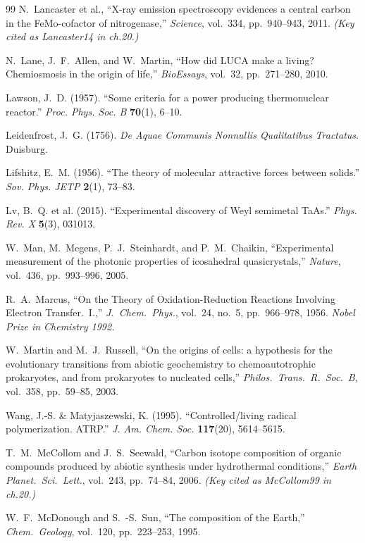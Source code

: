 \documentclass[12pt,oneside]{book}
\begin{document}
\begin{thebibliography}{99}
N.~Lancaster et al.,
``X-ray emission spectroscopy evidences a central carbon in the FeMo-cofactor of nitrogenase,''
\emph{Science}, vol.~334, pp.~940--943, 2011.
\textit{(Key cited as Lancaster14 in ch.20.)}

N.~Lane, J.~F.~Allen, and W.~Martin,
``How did LUCA make a living? Chemiosmosis in the origin of life,''
\emph{BioEssays}, vol.~32, pp.~271--280, 2010.

Lawson, J.~D. (1957).
``Some criteria for a power producing thermonuclear reactor.''
\textit{Proc. Phys. Soc. B} \textbf{70}(1), 6--10.

Leidenfrost, J.~G. (1756).
\textit{De Aquae Communis Nonnullis Qualitatibus Tractatus}. Duisburg.

Lifshitz, E.~M. (1956).
``The theory of molecular attractive forces between solids.''
\textit{Sov. Phys. JETP} \textbf{2}(1), 73--83.

Lv, B.~Q. et al. (2015).
``Experimental discovery of Weyl semimetal TaAs.''
\textit{Phys. Rev. X} \textbf{5}(3), 031013.

W.~Man, M.~Megens, P.~J.~Steinhardt, and P.~M.~Chaikin,
``Experimental measurement of the photonic properties of icosahedral quasicrystals,''
\emph{Nature}, vol.~436, pp.~993--996, 2005.

R.~A.~Marcus,
``On the Theory of Oxidation-Reduction Reactions Involving Electron Transfer.\ I.,''
\emph{J.\ Chem.\ Phys.}, vol.~24, no.~5, pp.~966--978, 1956.
\textit{Nobel Prize in Chemistry 1992.}

W.~Martin and M.~J.~Russell,
``On the origins of cells: a hypothesis for the evolutionary transitions from
abiotic geochemistry to chemoautotrophic prokaryotes, and from prokaryotes to
nucleated cells,''
\emph{Philos.\ Trans.\ R.\ Soc.\ B}, vol.~358, pp.~59--85, 2003.

Wang, J.-S. \& Matyjaszewski, K. (1995).
``Controlled/living radical polymerization. ATRP.''
\textit{J. Am. Chem. Soc.} \textbf{117}(20), 5614--5615.

T.~M.~McCollom and J.~S.~Seewald,
``Carbon isotope composition of organic compounds produced by abiotic synthesis under hydrothermal conditions,''
\emph{Earth Planet.\ Sci.\ Lett.}, vol.~243, pp.~74--84, 2006.
\textit{(Key cited as McCollom99 in ch.20.)}

W.~F.~McDonough and S.~-S.~Sun,
``The composition of the Earth,''
\emph{Chem.\ Geology}, vol.~120, pp.~223--253, 1995.


\end{thebibliography}
\end{document}
